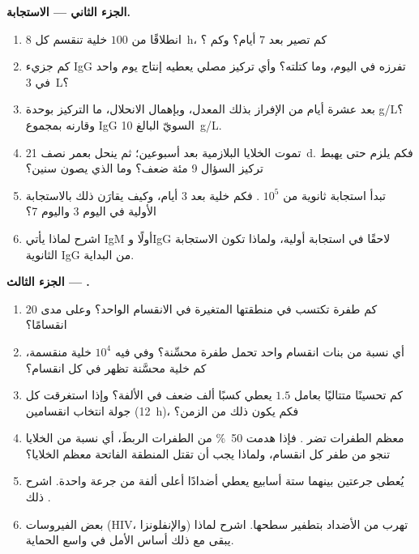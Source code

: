 \begin{problem}
\medskip
\noindent\textbf{الجزء الثاني --- الاستجابة.}
\begin{enumerate}[resume]
  \item انطلاقًا من $100$ خلية تنقسم كل \qty{8}{h}، كم تصير
        بعد $7$ أيام؟ وكم ؟
  \item كم جزيء IgG تفرزه في اليوم، وما كتلته؟ وأي تركيز
        مصلي يعطيه إنتاج يوم واحد في \qty{3}{L}؟
  \item بعد عشرة أيام من الإفراز بذلك المعدل، وبإهمال
        الانحلال، ما التركيز بوحدة g/L؟ وقارنه بمجموع IgG
        السويّ البالغ \qty{10}{g/L}.
  \item تموت الخلايا البلازمية بعد أسبوعين؛ ثم ينحل 
        بعمر نصف \qty{21}{d}. فكم يلزم حتى يهبط تركيز
        السؤال 9 مئة ضعف؟ وما الذي يصون  سنين؟
  \item تبدأ استجابة ثانوية من $10^{5}$ . فكم خلية
        بعد $3$ أيام، وكيف يقارَن ذلك بالاستجابة الأولية في
        اليوم 3 واليوم 7؟
  \item اشرح لماذا يأتي IgM أولًا وIgG لاحقًا في استجابة
        أولية، ولماذا تكون الاستجابة الثانوية IgG من البداية.
\end{enumerate}

\medskip
\noindent\textbf{الجزء الثالث --- .}
\begin{enumerate}[resume]
  \item كم طفرة تكتسب  في منطقتها المتغيرة في
        الانقسام الواحد؟ وعلى مدى $20$ انقسامًا؟
  \item أي نسبة من بنات انقسام واحد تحمل طفرة محسِّنة؟ وفي
         فيه $10^{4}$ خلية منقسمة، كم خلية
        محسَّنة تظهر في كل انقسام؟
  \item كم تحسينًا متتاليًا بعامل $1.5$ يعطي كسبًا ألف ضعف
        في الألفة؟ وإذا استغرقت كل جولة انتخاب انقسامين
        (\qty{12}{h})، فكم يكون ذلك من الزمن؟
  \item معظم الطفرات تضر . فإذا هدمت \qty{50}{\%} من
        الطفرات الربطَ، أي نسبة من الخلايا تنجو من طفر كل
        انقسام، ولماذا يجب أن تقتل المنطقة الفاتحة معظم
        الخلايا؟
  \item {} يُعطى جرعتين بينهما ستة أسابيع يعطي أضدادًا
        أعلى ألفة من جرعة واحدة. اشرح ذلك .
  \item بعض الفيروسات (HIV، والإنفلونزا) تهرب من الأضداد
        بتطفير سطحها. اشرح لماذا يبقى  مع ذلك
        أساس الأمل في  واسع الحماية.
\end{enumerate}


\end{problem}
